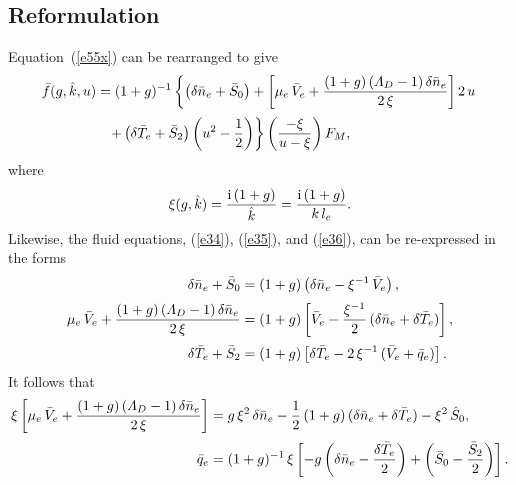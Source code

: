 \documentclass[12pt,prb,aps]{revtex4-1}
\begin{document}
\subsection{Reformulation}
Equation~(\ref{e55x}) can be rearranged to give
\begin{align}\label{e37}
\bar{f}(g,\hat{k},u)&=(1+g)^{-1}\left\{\left(\delta\bar{n}_e+\bar{S}_0\right)+\left[\mu_e\,\bar{V}_e+\frac{(1+g)\,({\mit\Lambda}_D-1)\,\delta\bar{n}_e}{2\,\xi}\right]2\,u
\right.\nonumber\\[0.5ex]
&\phantom{=}\left.+\left(\delta\bar{T}_e+\bar{S}_2\right)\left(u^2-\frac{1}{2}\right)\right\}\left(\frac{-\xi}{u-\xi}\right)F_M,
\end{align}
where
\begin{equation}\label{exi}
\xi (g,\hat{k})= \frac{{\rm i}\,(1+g)}{\hat{k}}= \frac{{\rm i}\,(1+g)}{k\,l_e}.
\end{equation}
Likewise, the fluid equations, (\ref{e34}), (\ref{e35}), and (\ref{e36}), can be re-expressed in the forms
\begin{align}\label{e39}
\delta\bar{n}_e+\bar{S}_0&= (1+g)\left(\delta\bar{n}_e-\xi^{-1}\,\bar{V}_e\right),\\[0.5ex]
\mu_e\,\bar{V}_e+\frac{(1+g)\,({\mit\Lambda}_D-1)\,\delta\bar{n}_e}{2\,\xi}&= (1+g)\left[\bar{V}_e-\frac{\xi^{-1}}{2}\,(\delta\bar{n}_e+\delta\bar{T}_e)\right],\\[0.5ex]
\delta\bar{T}_e+\bar{S}_2&= (1+g)\left[\delta \bar{T}_e-2\,\xi^{-1}\,(\bar{V}_e+\bar{q}_e)\right].\label{e41}
\end{align}
It follows that
\begin{align}\label{e42}
\xi\left[\mu_e\,\bar{V}_e+\frac{(1+g)\,({\mit\Lambda}_D-1)\,\delta\bar{n}_e}{2\,\xi}\right]& = g\,\xi^2\,\delta\bar{n}_e-\frac{1}{2}\,(1+g)\,(\delta \bar{n}_e+\delta\bar{T}_e)
-\xi^2\,\hat{S}_0,\\[0.5ex]
\bar{q}_e&= (1+g)^{-1}\,\xi\left[-g\left(\delta\bar{n}_e-\frac{\delta\bar{T}_e}{2}\right)+\left(\bar{S}_0-\frac{\bar{S}_2}{2}\right)\right].\label{e43}
\end{align}
\end{document}
